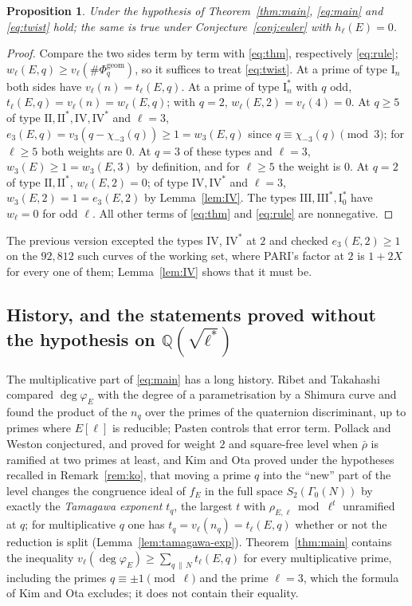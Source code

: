 \documentclass[11pt]{amsart}
\newtheorem{proposition}[theorem]{Proposition}
\theoremstyle{definition}
\newcommand{\Q}{\mathbb{Q}}
\newcommand{\degphi}{\deg\varphi_E}
\newcommand{\Phig}{\Phi^{\mathrm{geom}}}
\begin{document}
\begin{proposition}\label{prop:forms}
Under the hypothesis of Theorem~\ref{thm:main}, \eqref{eq:main} and \eqref{eq:twist} hold; the same is true under Conjecture~\ref{conj:euler} with $h_\ell(E)=0$.
\end{proposition}
\begin{proof}
Compare the two sides term by term with \eqref{eq:thm}, respectively \eqref{eq:rule}; $w_\ell(E,q)\ge v_\ell(\#\Phig_q)$, so it suffices to treat \eqref{eq:twist}. At a prime of type $\mathrm{I}_n$ both sides have $v_\ell(n)=t_\ell(E,q)$. At a prime of type $\mathrm{I}_n^*$ with $q$ odd, $t_\ell(E,q)=v_\ell(n)=w_\ell(E,q)$; with $q=2$, $w_\ell(E,2)=v_\ell(4)=0$. At $q\ge5$ of type $\mathrm{II},\mathrm{II}^*,\mathrm{IV},\mathrm{IV}^*$ and $\ell=3$, $e_3(E,q)=v_3(q-\chi_{-3}(q))\ge1=w_3(E,q)$ since $q\equiv\chi_{-3}(q)\pmod3$; for $\ell\ge5$ both weights are $0$. At $q=3$ of these types and $\ell=3$, $w_3(E)\ge1=w_3(E,3)$ by definition, and for $\ell\ge5$ the weight is $0$. At $q=2$ of type $\mathrm{II},\mathrm{II}^*$, $w_\ell(E,2)=0$; of type $\mathrm{IV},\mathrm{IV}^*$ and $\ell=3$, $w_3(E,2)=1=e_3(E,2)$ by Lemma~\ref{lem:IV}. The types $\mathrm{III},\mathrm{III}^*,\mathrm{I}_0^*$ have $w_\ell=0$ for odd $\ell$. All other terms of \eqref{eq:thm} and \eqref{eq:rule} are nonnegative.
\end{proof}
The previous version excepted the types $\mathrm{IV}$, $\mathrm{IV}^*$ at $2$ and checked $e_3(E,2)\ge1$ on the $92{,}812$ such curves of the working set, where PARI's factor at $2$ is $1+2X$ for every one of them; Lemma~\ref{lem:IV} shows that it must be.

\subsection{History, and the statements proved without the hypothesis on \texorpdfstring{$\Q(\sqrt{\ell^*})$}{Q(sqrt l*)}}
The multiplicative part of \eqref{eq:main} has a long history. Ribet and Takahashi \cite{RibetTakahashi97,Takahashi01} compared $\degphi$ with the degree of a parametrisation by a Shimura curve and found the product of the $n_q$ over the primes of the quaternion discriminant, up to primes where $E[\ell]$ is reducible; Pasten \cite{Pasten} controls that error term. Pollack and Weston \cite{PollackWeston11} conjectured, and proved for weight $2$ and square-free level when $\bar\rho$ is ramified at two primes at least, and Kim and Ota \cite{KimOta} proved under the hypotheses recalled in Remark~\ref{rem:ko}, that moving a prime $q$ into the ``new'' part of the level changes the congruence ideal of $f_E$ in the full space $S_2(\Gamma_0(N))$ by exactly the \emph{Tamagawa exponent} $t_q$, the largest $t$ with $\rho_{E,\ell}\bmod\ell^t$ unramified at $q$; for multiplicative $q$ one has $t_q=v_\ell(n_q)=t_\ell(E,q)$ whether or not the reduction is split (Lemma~\ref{lem:tamagawa-exp}). Theorem~\ref{thm:main} contains the inequality $v_\ell(\degphi)\ge\sum_{q\,\|\,N}t_\ell(E,q)$ for every multiplicative prime, including the primes $q\equiv\pm1\pmod\ell$ and the prime $\ell=3$, which the formula of Kim and Ota excludes; it does not contain their equality.
\end{document}
